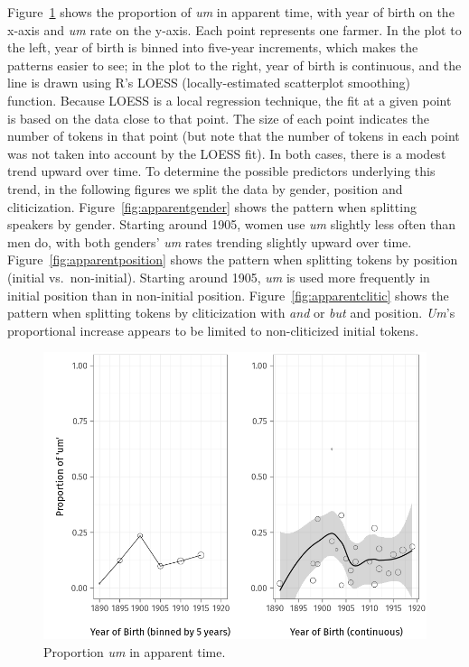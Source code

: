 \documentclass[11pt]{article}
\begin{document}
Figure~\ref{fig:apparenttime} shows the proportion of \emph{um} in apparent
time, with year of birth on the x-axis and \emph{um} rate on the y-axis.
Each point represents one farmer.
In the plot to the left, year of birth is binned into five-year increments,
which makes the patterns easier to see;
in the plot to the right, year of birth is continuous, and the line is drawn
using R's LOESS (locally-estimated scatterplot smoothing) function.
Because LOESS is a local regression technique, the fit at a given point is based
on the data close to that point.
The size of each point indicates the number of tokens in that point (but note
that the number of tokens in each point was not taken into account by the
LOESS fit).
In both cases, there is a modest trend upward over time.
To determine the possible predictors underlying this trend, in the following
figures we split the data by gender, position and cliticization.
Figure~\ref{fig:apparentgender} shows the pattern when splitting speakers by
gender.
Starting around 1905, women use \emph{um} slightly less often than men do, with
both genders' \emph{um} rates trending slightly upward over time.
Figure~\ref{fig:apparentposition} shows the pattern when splitting tokens by
position (initial vs.\ non-initial).
Starting around 1905, \emph{um} is used more frequently in initial position than
in non-initial position.
Figure~\ref{fig:apparentclitic} shows the pattern when splitting tokens by
cliticization with \emph{and} or \emph{but} and position.
\emph{Um}'s proportional increase appears to be limited to non-cliticized
initial tokens.

\begin{figure}[htpb]
    \centering
    \includegraphics[width=0.8\linewidth]{figures/apparenttime.png}
    \caption{Proportion \emph{um} in apparent time.}
    \label{fig:apparenttime}
\end{figure}
\end{document}
